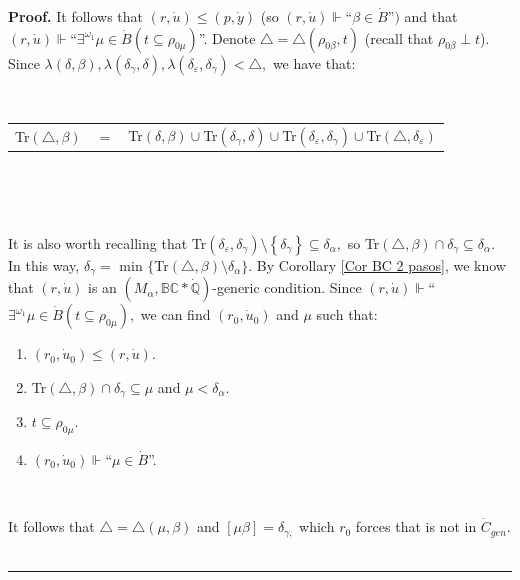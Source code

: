 \documentclass{article}
\newenvironment{proof}[1][Proof]{\noindent\textbf{#1.} }{\ \rule{0.5em}{0.5em}}
\begin{document}
\begin{proof}
It follows that $(r,\dot{u})\leq(p,\dot{y})$ (so $(r,\dot{u})\Vdash
$\textquotedblleft$\beta\in\dot{B}$\textquotedblright$)$ and that
\newline$(r,\dot{u})\Vdash$\textquotedblleft$\exists^{\omega_{1}}\mu\in\dot
{B}\left(  t\subseteq\rho_{0\mu}\right)  $\textquotedblright. Denote
$\triangle=\triangle\left(  \rho_{0\beta},t\right)  $ (recall that
$\rho_{0\beta}\perp t$). Since $\lambda\left(  \delta,\beta\right)
,\lambda\left(  \delta_{\gamma},\delta\right)  ,\lambda\left(  \delta
_{\varepsilon},\delta_{\gamma}\right)  <\triangle,$ we have that:

\qquad\ \ \ \ \ 

\hfill%
\begin{tabular}
[c]{ccc}%
\textsf{Tr}$(\triangle,\beta)$ & $=$ & \textsf{Tr}$(\delta,\beta)\cup
$\textsf{Tr}$(\delta_{\gamma},\delta)\cup$\textsf{Tr}$(\delta_{\varepsilon
},\delta_{\gamma})\cup$\textsf{Tr}$(\triangle,\delta_{\varepsilon})$%
\end{tabular}
\hfill\ 

\qquad\ \qquad\ \ \ \ 

It is also worth recalling that \textsf{Tr}$(\delta_{\varepsilon}%
,\delta_{\gamma})\setminus\left\{  \delta_{\gamma}\right\}  \subseteq
\delta_{\alpha},$ so \textsf{Tr}$(\triangle,\beta)\cap\delta_{\gamma}%
\subseteq\delta_{\alpha}.$ In this way, $\delta_{\gamma}=$ \textsf{min}%
$\{$\textsf{Tr}$(\triangle,\beta)\setminus\delta_{\alpha}\}.$ By Corollary
\ref{Cor BC 2 pasos}, we know that $(r,\dot{u})$ is an $(M_{\alpha
},\mathbb{BC\ast\dot{Q}})$-generic condition. Since $(r,\dot{u})\Vdash
$\textquotedblleft$\exists^{\omega_{1}}\mu\in\dot{B}\left(  t\subseteq
\rho_{0\mu}\right)  ,$ we can find $(r_{0},\dot{u}_{0})$ and $\mu$ such that:

\begin{enumerate}
\item $(r_{0},\dot{u}_{0})\leq(r,\dot{u}).$

\item \textsf{Tr}$(\triangle,\beta)\cap\delta_{\gamma}\subseteq\mu$ and
$\mu<\delta_{\alpha}.$

\item $t\subseteq\rho_{0\mu}.$

\item $(r_{0},\dot{u}_{0})\Vdash$\textquotedblleft$\mu\in\dot{B}%
$\textquotedblright.
\end{enumerate}

\qquad\ \ 

It follows that $\triangle=\triangle\left(  \mu,\beta\right)  $ and $\left[
\mu\beta\right]  =\delta_{\gamma,}$ which $r_{0}$ forces that is not in
$\dot{C}_{gen}.$
\end{proof}
\end{document}
